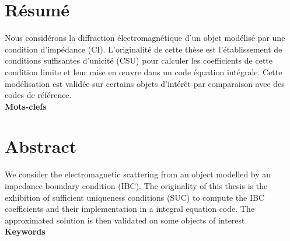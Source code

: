 \thispagestyle{empty}
\begin{center}
\Large
\textbf{\doctitlefr}
\end{center}
\section*{Résumé}
Nous considérons la diffraction électromagnétique d'un objet modélisé par une condition d'impédance (CI). L'originalité de cette thèse est l'établissement de conditions suffisantes d'unicité (CSU) pour calculer les coefficients de cette condition limite et leur mise en œuvre dans un code équation intégrale. Cette modélisation est validée sur certains objets d'intérêt par comparaison avec des codes de référence.
\\

\textbf{Mots-clefs}


\dockeywordsfr

\hrulefill
\begin{center}
\Large
\textbf{\doctitleeng}
\end{center}
\section*{Abstract}
We consider the electromagnetic scattering from an object modelled by an impedance boundary condition (IBC). The originality of this thesis is the exhibition of sufficient uniqueness conditions (SUC) to compute the IBC coefficients and their implementation in a integral equation code. The approximated solution is then validated on some objects of interest.
\\

\textbf{Keywords}


\dockeywordseng
